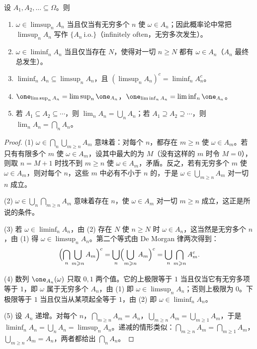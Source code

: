 \begin{proposition}\label{prop:set-systems:limsup}
设 $A_1,A_2,\dots\subseteq\Omega$。则
\begin{enumerate}
\item $\omega\in\limsup_nA_n$ 当且仅当有无穷多个 $n$ 使 $\omega\in A_n$；因此概率论中常把 $\limsup_nA_n$ 写作 $\{A_n\ \text{i.o.}\}$（infinitely often，无穷多次发生）。
\item $\omega\in\liminf_nA_n$ 当且仅当存在 $N$，使得对一切 $n\geqslant N$ 都有 $\omega\in A_n$（$A_n$ 最终总发生）。
\item $\liminf_nA_n\subseteq\limsup_nA_n$，且 $(\limsup_nA_n)^c=\liminf_nA_n^c$。
\item $\one_{\limsup_nA_n}=\limsup_n\one_{A_n}$，$\one_{\liminf_nA_n}=\liminf_n\one_{A_n}$。
\item 若 $A_1\subseteq A_2\subseteq\cdots$，则 $\lim_nA_n=\bigcup_nA_n$；若 $A_1\supseteq A_2\supseteq\cdots$，则 $\lim_nA_n=\bigcap_nA_n$。
\end{enumerate}
\end{proposition}
\begin{proof}
(1) $\omega\in\bigcap_n\bigcup_{m\geqslant n}A_m$ 意味着：对每个 $n$，都存在 $m\geqslant n$ 使 $\omega\in A_m$。若只有有限多个 $m$ 使 $\omega\in A_m$，设其中最大的为 $M$（没有这样的 $m$ 时令 $M=0$），则取 $n=M+1$ 时找不到 $m\geqslant n$ 使 $\omega\in A_m$，矛盾。反之，若有无穷多个 $m$ 使 $\omega\in A_m$，则对每个 $n$，这些 $m$ 中必有不小于 $n$ 的，于是 $\omega\in\bigcup_{m\geqslant n}A_m$ 对一切 $n$ 成立。

(2) $\omega\in\bigcup_n\bigcap_{m\geqslant n}A_m$ 意味着存在 $n$，使 $\omega\in A_m$ 对一切 $m\geqslant n$ 成立，这正是所说的条件。

(3) 若 $\omega\in\liminf_nA_n$，由 (2) 存在 $N$ 使 $n\geqslant N$ 时 $\omega\in A_n$，这当然是无穷多个 $n$，由 (1) 得 $\omega\in\limsup_nA_n$。第二个等式由 De Morgan 律两次得到：
\[
\Bigl(\bigcap_n\bigcup_{m\geqslant n}A_m\Bigr)^c=\bigcup_n\Bigl(\bigcup_{m\geqslant n}A_m\Bigr)^c=\bigcup_n\bigcap_{m\geqslant n}A_m^c .
\]

(4) 数列 $\one_{A_n}(\omega)$ 只取 $0,1$ 两个值。它的上极限等于 $1$ 当且仅当它有无穷多项等于 $1$，即 $\omega$ 属于无穷多个 $A_n$，由 (1) 即 $\omega\in\limsup_nA_n$；否则上极限为 $0$。下极限等于 $1$ 当且仅当从某项起全等于 $1$，由 (2) 即 $\omega\in\liminf_nA_n$。

(5) 设 $A_n$ 递增。对每个 $n$，$\bigcap_{m\geqslant n}A_m=A_n$，$\bigcup_{m\geqslant n}A_m=\bigcup_{m\geqslant 1}A_m$，于是 $\liminf_nA_n=\bigcup_nA_n=\limsup_nA_n$。递减的情形类似：$\bigcap_{m\geqslant n}A_m=\bigcap_{m\geqslant1}A_m$，$\bigcup_{m\geqslant n}A_m=A_n$，两者都给出 $\bigcap_nA_n$。
\end{proof}

